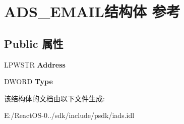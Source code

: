 \hypertarget{struct_a_d_s___e_m_a_i_l}{}\section{A\+D\+S\+\_\+\+E\+M\+A\+I\+L结构体 参考}
\label{struct_a_d_s___e_m_a_i_l}
\subsection*{Public 属性}
\begin{DoxyCompactItemize}
\item 
\mbox{\label{struct_a_d_s___e_m_a_i_l_a4bd1a38761a805b562522a3f10dff8dc}} 
L\+P\+W\+S\+TR {\bfseries Address}
\item 
\mbox{\label{struct_a_d_s___e_m_a_i_l_a91ea373674f1b9bea062342dceec0700}} 
D\+W\+O\+RD {\bfseries Type}
\end{DoxyCompactItemize}


该结构体的文档由以下文件生成\+:\begin{DoxyCompactItemize}
\item 
E\+:/\+React\+O\+S-\/0../sdk/include/psdk/iads.\+idl\end{DoxyCompactItemize}
